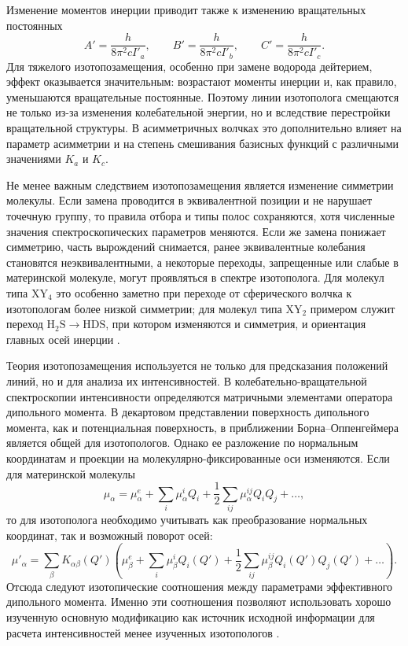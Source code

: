 Изменение моментов инерции приводит также к изменению вращательных постоянных
\begin{equation}
A'=\frac{h}{8\pi^2 c I'_a},\qquad
B'=\frac{h}{8\pi^2 c I'_b},\qquad
C'=\frac{h}{8\pi^2 c I'_c}.
\end{equation}
Для тяжелого изотопозамещения, особенно при замене водорода дейтерием, эффект
оказывается значительным: возрастают моменты инерции и, как правило,
уменьшаются вращательные постоянные. Поэтому линии изотополога смещаются не
только из-за изменения колебательной энергии, но и вследствие перестройки
вращательной структуры. В асимметричных волчках это дополнительно влияет на
параметр асимметрии и на степень смешивания базисных функций с различными
значениями $K_a$ и $K_c$.

Не менее важным следствием изотопозамещения является изменение симметрии
молекулы. Если замена проводится в эквивалентной позиции и не нарушает точечную
группу, то правила отбора и типы полос сохраняются, хотя численные значения
спектроскопических параметров меняются. Если же замена понижает симметрию,
часть вырождений снимается, ранее эквивалентные колебания становятся
неэквивалентными, а некоторые переходы, запрещенные или слабые в материнской
молекуле, могут проявляться в спектре изотополога. Для молекул типа
$\mathrm{XY_4}$ это особенно заметно при переходе от сферического волчка к
изотопологам более низкой симметрии; для молекул типа $\mathrm{XY_2}$ примером
служит переход $\mathrm{H_2S}\rightarrow\mathrm{HDS}$, при котором изменяются и
симметрия, и ориентация главных осей инерции \cite{d2s_sydow2019,hds_sydow2019,4300}.

Теория изотопозамещения используется не только для предсказания положений
линий, но и для анализа их интенсивностей. В колебательно-вращательной
спектроскопии интенсивности определяются матричными элементами оператора
дипольного момента. В декартовом представлении поверхность дипольного момента,
как и потенциальная поверхность, в приближении Борна--Оппенгеймера является
общей для изотопологов. Однако ее разложение по нормальным координатам и
проекции на молекулярно-фиксированные оси изменяются. Если для материнской
молекулы
\begin{equation}
\mu_\alpha=\mu^e_\alpha+\sum_i \mu^i_\alpha Q_i+
\frac{1}{2}\sum_{ij}\mu^{ij}_\alpha Q_iQ_j+\ldots,
\end{equation}
то для изотополога необходимо учитывать как преобразование нормальных координат,
так и возможный поворот осей:
\begin{equation}
\mu'_\alpha=\sum_\beta K_{\alpha\beta}(Q')
\left(\mu^e_\beta+\sum_i \mu^i_\beta Q_i(Q')+
\frac{1}{2}\sum_{ij}\mu^{ij}_\beta Q_i(Q')Q_j(Q')+\ldots\right).
\end{equation}
Отсюда следуют изотопические соотношения между параметрами эффективного
дипольного момента. Именно эти соотношения позволяют использовать хорошо
изученную основную модификацию как источник исходной информации для расчета
интенсивностей менее изученных изотопологов \cite{Ulenikov2019a,Ulenikov2020a}.

